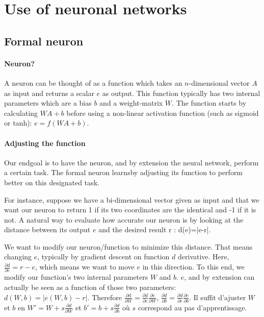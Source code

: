 \documentclass[conference]{IEEEtran}
\begin{document}
\section{Use of neuronal networks}

\subsection{Formal neuron}

\paragraph{Neuron?}
A neuron can be thought of as a function which takes an $n$-dimensional vector $A$ as input and returns a scalar $e$ as output. This function typically has two internal parameters which are a bias $b$ and a weight-matrix $W$. The function starts by calculating $WA+b$ before using a non-linear activation function (such as sigmoid or tanh): $e=f(WA+b)$.

\paragraph{Adjusting the function}
Our endgoal is to have the neuron, and by extension the neural network, perform
a certain task. The formal neuron \og learns\fg by adjusting its function to perform better on
this designated task.

For instance, suppose we have a bi-dimensional vector given as input and that we
want our neuron to return 1 if its two coordinates are the identical and -1 if
it is not. A natural way to evaluate how accurate our neuron is by looking at the
distance between its output $e$ and the desired result r : d(e)=|e-r|.

We want to modify our neuron/function to minimize this distance. That means
changing $e$, typically by gradient descent on function $d$ derivative. Here,
$\frac{\partial d}{\partial e} = r-e$, which means we want to \og move\fg{} $e$ in this
direction. To this end, we modify our function's two internal parameters $W$ and
$b$. $e$, and by extension can actually be seen as a function of those two
parameters: $d(W,b)=|e(W,b)-r|$. Therefore $\frac{\partial d}{\partial W}
   = \frac{\partial d}{\partial e}\frac{\partial e}{\partial W}$,
$\frac{\partial d}{\partial b}
   = \frac{\partial d}{\partial e}\frac{\partial e}{\partial b}$. Il suffit
   d'ajuster $W$ et $b$ en $W'=W + s\frac{\partial d}{\partial W}$ et $b'=b +
   s\frac{\partial d}{\partial b}$ où $s$ correspond au pas d'apprentissage.
\end{document}
